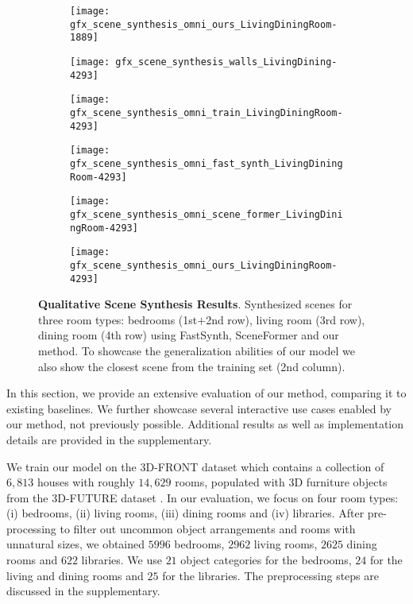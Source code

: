 \documentclass{article}
\newcommand{\boldparagraph}[1]{\vspace{0.2cm}\noindent{\bf #1:} }
\begin{document}
\begin{figure}
\begin{subfigure}[b]{0.17\linewidth}
		\centering
		\texttt{[image: gfx\_scene\_synthesis\_omni\_ours\_LivingDiningRoom-1889]}
    \end{subfigure}\hfill \vspace{-1.5em}
        \hfill \begin{subfigure}[b]{0.17\linewidth}
		\centering
		\texttt{[image: gfx\_scene\_synthesis\_walls\_LivingDining-4293]}
    \end{subfigure}\begin{subfigure}[b]{0.17\linewidth}
		\centering
		\texttt{[image: gfx\_scene\_synthesis\_omni\_train\_LivingDiningRoom-4293]}
    \end{subfigure}\begin{subfigure}[b]{0.17\linewidth}
		\centering
		\texttt{[image: gfx\_scene\_synthesis\_omni\_fast\_synth\_LivingDiningRoom-4293]}
    \end{subfigure}\begin{subfigure}[b]{0.17\linewidth}
		\centering
		\texttt{[image: gfx\_scene\_synthesis\_omni\_scene\_former\_LivingDiningRoom-4293]}
    \end{subfigure}\begin{subfigure}[b]{0.17\linewidth}
		\centering
		\texttt{[image: gfx\_scene\_synthesis\_omni\_ours\_LivingDiningRoom-4293]}
    \end{subfigure}\hfill \caption{\small {\bf Qualitative Scene Synthesis Results}. Synthesized scenes for three room types: bedrooms (1st$+$2nd row), living room (3rd row), dining room (4th row) using FastSynth, SceneFormer and our method. To showcase the generalization abilities of our model we also show the closest scene from the training set (2nd column).}
    \label{fig:scene_synthesis_qualitative}
    \vspace{-1.2em}
\end{figure}


In this section, we provide an extensive evaluation of our method, comparing it to existing baselines. We further showcase several interactive use cases enabled by our method, not previously possible. Additional results as well as implementation details are provided in the supplementary.

\vspace{-2mm}
\boldparagraph{Datasets}We train our model on the 3D-FRONT dataset \cite{Fu2020ARXIVa} which contains a collection
of $6,813$ houses with roughly $14,629$ rooms,
populated with 3D furniture objects from the 3D-FUTURE dataset
\cite{Fu2020ARXIVb}. In our evaluation, we focus on four room types: (i) bedrooms,
(ii) living rooms, (iii) dining rooms and (iv) libraries. After
pre-processing to filter out uncommon object arrangements and rooms with
unnatural sizes, we obtained $5996$ bedrooms, $2962$ living rooms,
$2625$ dining rooms and $622$ libraries. We use $21$ object categories for the
bedrooms, $24$ for the living and dining rooms and $25$ for the
libraries. The preprocessing steps are discussed in the
supplementary. 
\end{document}

